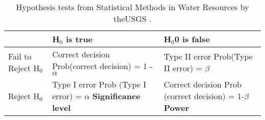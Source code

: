 \begin{table}[htbp]
\centering
\caption{Hypothesis tests from Statistical Methods in Water Resources by theUSGS  \citep{helsel1992statistical}.}
\begin{tabular}{l|p{4cm}|p{3.8cm}}
\toprule
                                   & H$_0$ is true                                                                                          & H$_0$0 is false                                                                                     \\
\midrule
Fail to Reject H$_0$  &Correct decision Prob(correct decision) = 1 -$\alpha$                             & Type II error Prob(Type II error) = $\beta$                                         \\ \cline{2-3} \noalign{\smallskip}
 Reject H$_0$            & Type I error Prob (Type I error) = $\alpha$ \textbf{Significance level} &Correct decision Prob (correct decision) = 1-$\beta$ \textbf{Power}  \\ 
\bottomrule
\end{tabular}
\label{tab:HypothesisTests}
\end{table}                            